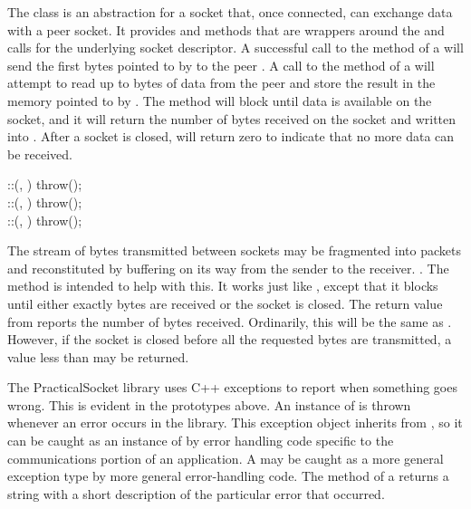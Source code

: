 The  class is an abstraction for a socket
that, once connected, can exchange data with a peer socket.  It
provides  and  methods that are wrappers
around the  and  calls for the
underlying socket descriptor.  A successful call to the
 method of a  will send the
first  bytes pointed to by  to the peer
.  A call to the  method of a
 will attempt to read up to
 bytes of data from the peer and store the result in
the memory pointed to by .  The  method
will block until data is available on the socket, and it will return
the number of bytes received on the socket and written into .
After a socket is closed,  will return zero to indicate
that no more data can be received.

\begin{inlinefcn}
 ::(,
 ) throw();\\
 ::(, 
) throw();\\
 ::(, 
) throw();
\end{inlinefcn}

The stream of bytes transmitted between sockets may be fragmented into
packets and reconstituted by buffering on its way from the sender to
the receiver.  .  The  method is intended
to help with this.  It works just like , except that it
blocks until either exactly  bytes are received or
the socket is closed.  The return value from 
reports the number of bytes received.  Ordinarily, this will be the
same as .  However, if the socket is closed before
all the requested bytes are transmitted, a value less than
 may be returned.

The PracticalSocket library uses C++ exceptions to report when
something goes wrong.  This is evident in the prototypes above.  An
instance of  is thrown whenever an error occurs
in the library.  This exception object inherits from
, so it can be caught as an instance of
 by error handling code specific to the
communications portion of an application.  A 
may be caught as a more general exception type by more general
error-handling code.  The  method of a
 returns a string with a short description of
the particular error that occurred.

